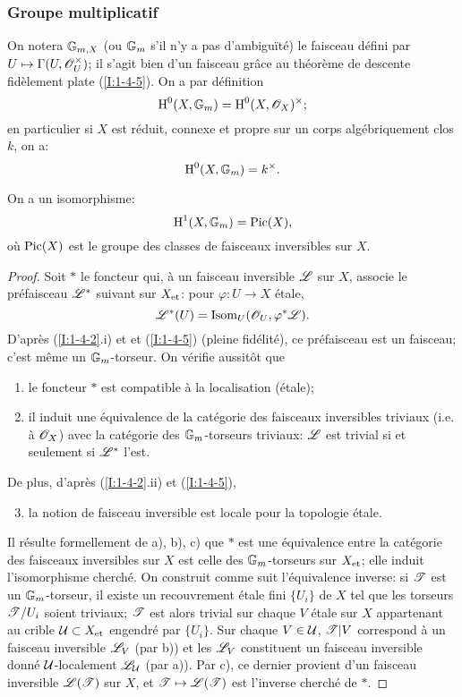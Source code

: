 \documentclass[oneside]{book}
\begin{document}
\subsubsection{Groupe multiplicatif}\label{I:2-2-2}

On notera $\mathbb{G}_{m,X}$ (ou $\mathbb{G}_m$ s'il n'y a pas d'ambiguïté) le faisceau 
défini par $U\mapsto \Gamma(U,\mathscr{O}_U^\times)$; il s'agit bien d'un faisceau 
grâce au théorème de descente fidèlement plate (\ref{I:1-4-5}). On a 
par définition 
\[
  \operatorname{H}^0(X,\mathbb{G}_m) = \operatorname{H}^0(X,\mathscr{O}_X)^\times\text{;}
\]
en particulier si $X$ est réduit, connexe et propre sur un corps 
algébriquement clos $k$, on a:
\[
  \operatorname{H}^0(X,\mathbb{G}_m) = k^\times\text{.}
\]

\begin{proposition}\label{I:2-2-3}
On a un isomorphisme:
\[
  \operatorname{H}^1(X,\mathbb{G}_m) = \operatorname{Pic}(X)\text{,}
\]
où $\operatorname{Pic}(X)$ est le groupe des classes de faisceaux inversibles sur $X$.
\end{proposition}
\begin{proof}
Soit $*$ le foncteur qui, à un faisceau inversible $\mathscr{L}$ sur $X$, associe le 
préfaisceau $\mathscr{L}^*$ suivant sur ${X}_{\textnormal{et}}$: pour $\varphi:U\to X$ étale, 
\[
  \mathscr{L}^*(U)=\operatorname{Isom}_U(\mathscr{O}_U,\varphi^*\mathscr{L})\text{.}
\]
D'après (\ref{I:1-4-2}.i) et et (\ref{I:1-4-5}) (pleine fidélité), ce 
préfaisceau est un faisceau; c'est même un $\mathbb{G}_m$-torseur. On vérifie 
aussitôt que 
\begin{enumerate}[\indent a)]
  \item le foncteur $*$ est compatible à la localisation (étale);
  \item il induit une équivalence de la catégorie des faisceaux 
    inversibles triviaux (i.e. à $\mathscr{O}_X$) avec la catégorie des 
    $\mathbb{G}_m$-torseurs triviaux: $\mathscr{L}$ est trivial si et seulement si $\mathscr{L}^*$ 
    l'est.
\end{enumerate}

De plus, d'après (\ref{I:1-4-2}.ii) et (\ref{I:1-4-5}), 
\begin{enumerate}[\indent a)]
\setcounter{enumi}{2}
  \item la notion de faisceau inversible est locale pour la topologie étale. 
\end{enumerate}

Il résulte formellement de a), b), c) que $*$ est une équivalence entre la 
catégorie des faisceaux inversibles sur $X$ est celle des $\mathbb{G}_m$-torseurs 
sur ${X}_{\textnormal{et}}$; elle induit l'isomorphisme cherché. On construit comme suit 
l'équivalence inverse: si $\mathscr{T}$ est un $\mathbb{G}_m$-torseur, il existe un 
recouvrement étale fini $\{U_i\}$ de $X$ tel que les torseurs $\mathscr{T}/U_i$ soient 
triviaux; $\mathscr{T}$ est alors trivial sur chaque $V$ étale sur $X$ appartenant au 
crible $\mathcal{U}\subset {X}_{\textnormal{et}}$ engendré par $\{U_i\}$. Sur chaque 
$V\in\mathcal{U}$, $\mathscr{T}|V$ correspond à un faisceau inversible $\mathscr{L}_V$ (par b)) et les 
$\mathscr{L}_V$ constituent un faisceau inversible donné $\mathcal{U}$-localement $\mathscr{L}_{\mathcal{U}}$ 
(par a)). Par c), ce dernier provient d'un faisceau inversible $\mathscr{L}(\mathscr{T})$ sur 
$X$, et $\mathscr{T}\mapsto \mathscr{L}(\mathscr{T})$ est l'inverse cherché de $*$. 
\end{proof}
\end{document}
